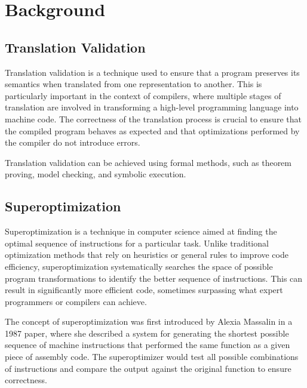 
\chapter{Background}
\label{chap:background}

\section {Translation Validation}



Translation validation is a technique used to ensure that a program
preserves its semantics when translated from one representation to
another.
%
This is particularly important in the context of compilers,
where multiple stages of translation are involved in transforming a
high-level programming language into machine code.
%
The correctness of the translation process is crucial to ensure that
the compiled program behaves as expected and that optimizations
performed by the compiler do not introduce errors.
%

Translation validation can be achieved using formal methods, such as
theorem proving, model checking, and symbolic execution.
%





\section{Superoptimization}
\label{sec:superoptimization}


Superoptimization is a technique in computer science aimed at finding
the optimal sequence of instructions for a particular task.
%
Unlike traditional optimization methods that rely on heuristics or
general rules to improve code efficiency, superoptimization
systematically searches the space of possible program transformations
to identify the better sequence of instructions.
%
This can result in significantly more efficient code, sometimes
surpassing what expert programmers or compilers can achieve.

The concept of superoptimization was first introduced by Alexia
Massalin in a 1987 paper, where she described a system for generating
the shortest possible sequence of machine instructions that performed
the same function as a given piece of assembly code. The
superoptimizer would test all possible combinations of instructions
and compare the output against the original function to ensure
correctness.

